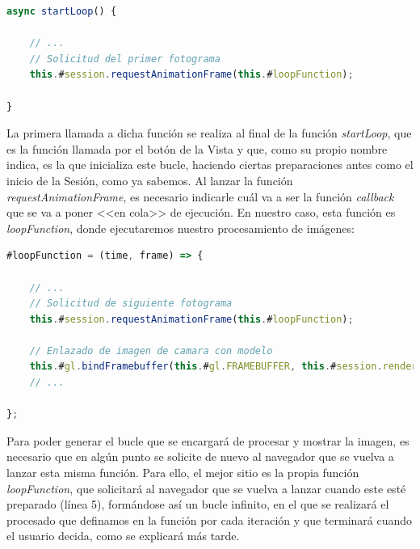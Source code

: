 \documentclass{subfiles}
\begin{document}
\newpage
\begin{lstlisting}[language=JavaScript, caption={Función que solicita la carga del siguiente fotograma.}, label={lst:2.5}]
async startLoop() {

    // ...
    // Solicitud del primer fotograma
    this.#session.requestAnimationFrame(this.#loopFunction);
    
}
\end{lstlisting}

        La primera llamada a dicha función se realiza al final de la función \textit{startLoop}, que es la función llamada por el botón de la Vista y que, como su propio nombre indica, es la que inicializa este bucle, haciendo ciertas preparaciones antes como el inicio de la Sesión, como ya sabemos. Al lanzar la función \textit{requestAnimationFrame}, es necesario indicarle cuál va a ser la función \textit{callback} que se va a poner <<en cola>> de ejecución. En nuestro caso, esta función es \textit{loopFunction}, donde ejecutaremos nuestro procesamiento de imágenes:

\begin{lstlisting}[language=JavaScript, caption={Función bucle con el contenido mínimo}, label={lst:2.6}]
#loopFunction = (time, frame) => {

    // ...
    // Solicitud de siguiente fotograma
    this.#session.requestAnimationFrame(this.#loopFunction);

    // Enlazado de imagen de camara con modelo
    this.#gl.bindFramebuffer(this.#gl.FRAMEBUFFER, this.#session.renderState.baseLayer.framebuffer);
    // ...
    
};
\end{lstlisting}

        Para poder generar el bucle que se encargará de procesar y mostrar la imagen, es necesario que en algún punto se solicite de nuevo al navegador que se vuelva a lanzar esta misma función. Para ello, el mejor sitio es la propia función \textit{loopFunction}, que solicitará al navegador que se vuelva a lanzar cuando este esté preparado (línea 5), formándose así un bucle infinito, en el que se realizará el procesado que definamos en la función por cada iteración y que terminará cuando el usuario decida, como se explicará más tarde.
\end{document}
